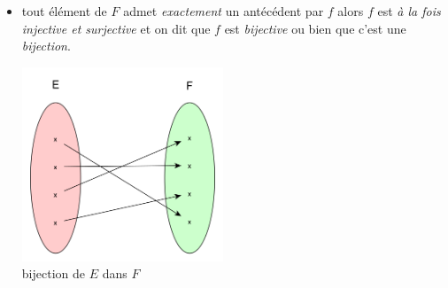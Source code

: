 \begin{definition}
\begin{itemize}
\begin{center}
              \end{center}
        \item tout élément de $F$ admet \textit{exactement} un antécédent par $f$ alors  $f$ est \textit{à la fois injective et surjective} et on dit que $f$ est \textit{bijective} ou bien que c'est une \textit{bijection}.
              \begin{center}
                  \includegraphics[width=6cm]{ensembles/img/ex_bij.png}\\ {\footnotesize bijection de $E$ dans $F$}
              \end{center}
    \end{itemize}
\end{definition}


